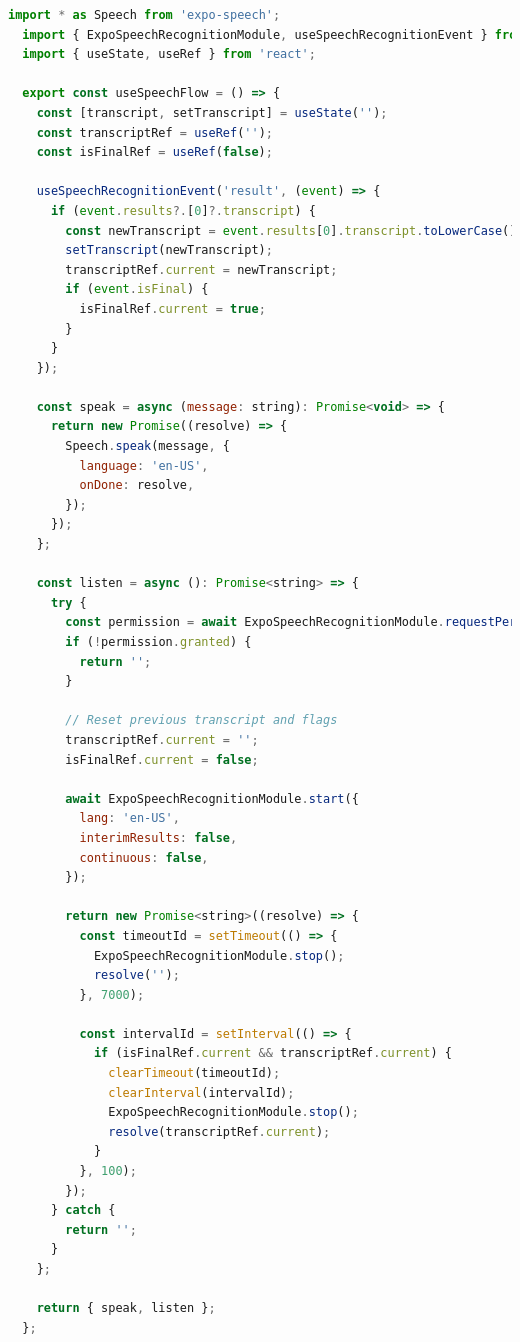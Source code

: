 \begin{lstlisting}[language=JavaScript, caption=useSpeechFlowHook, label=lst:hook_speech]
  import * as Speech from 'expo-speech';
  import { ExpoSpeechRecognitionModule, useSpeechRecognitionEvent } from 'expo-speech-recognition';
  import { useState, useRef } from 'react';
  
  export const useSpeechFlow = () => {
    const [transcript, setTranscript] = useState('');
    const transcriptRef = useRef('');
    const isFinalRef = useRef(false);
  
    useSpeechRecognitionEvent('result', (event) => {
      if (event.results?.[0]?.transcript) {
        const newTranscript = event.results[0].transcript.toLowerCase();
        setTranscript(newTranscript);
        transcriptRef.current = newTranscript;
        if (event.isFinal) {
          isFinalRef.current = true;
        }
      }
    });
  
    const speak = async (message: string): Promise<void> => {
      return new Promise((resolve) => {
        Speech.speak(message, {
          language: 'en-US',
          onDone: resolve,
        });
      });
    };
  
    const listen = async (): Promise<string> => {
      try {
        const permission = await ExpoSpeechRecognitionModule.requestPermissionsAsync();
        if (!permission.granted) {
          return '';
        }
  
        // Reset previous transcript and flags
        transcriptRef.current = '';
        isFinalRef.current = false;
  
        await ExpoSpeechRecognitionModule.start({
          lang: 'en-US',
          interimResults: false,
          continuous: false,
        });
  
        return new Promise<string>((resolve) => {
          const timeoutId = setTimeout(() => {
            ExpoSpeechRecognitionModule.stop();
            resolve('');
          }, 7000);
  
          const intervalId = setInterval(() => {
            if (isFinalRef.current && transcriptRef.current) {
              clearTimeout(timeoutId);
              clearInterval(intervalId);
              ExpoSpeechRecognitionModule.stop();
              resolve(transcriptRef.current);
            }
          }, 100);
        });
      } catch {
        return '';
      }
    };
  
    return { speak, listen };
  };
\end{lstlisting}
  
